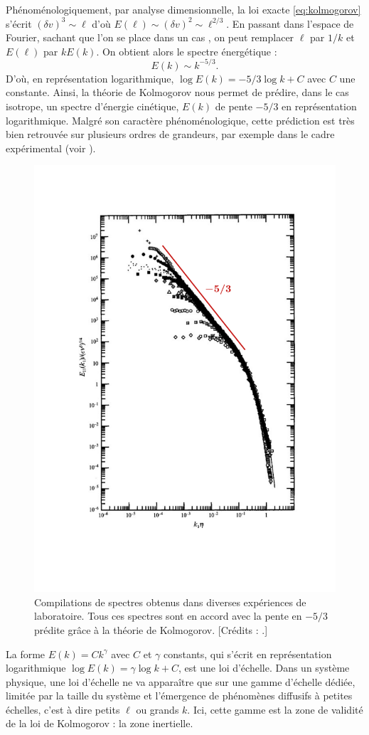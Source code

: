  Phénoménologiquement, par analyse dimensionnelle, la loi exacte \eqref{eq:kolmogorov} s'écrit $(\delta v)^3 \sim \ell$ d'où $E(\ell) \sim (\delta v)^2 \sim \ell^{2/3}$. En passant dans l'espace de Fourier, sachant que l'on se place dans un cas , on peut remplacer $\ell$ par $1/k$ et $E(\ell)$ par $k E(k)$. On obtient alors le spectre énergétique :
 \begin{equation}
     E(k) \sim k^{-5/3}.
 \end{equation} 
 D'où, en représentation logarithmique, $\log E(k) = -5/3 \log k + C $ avec $C$ une constante. Ainsi, la théorie de Kolmogorov nous permet de prédire, dans le cas isotrope, un spectre d'énergie cinétique, $E(k)$ de pente $-5/3$ en représentation logarithmique. Malgré son caractère phénoménologique, cette prédiction est très bien retrouvée sur plusieurs ordres de grandeurs, par exemple dans le cadre expérimental (voir  ). 
 \begin{figure}[]
  \centering
 \includegraphics[width=0.8\linewidth,trim=1cm 4cm 1cm 3cm, clip=true]{./Mainmatter/Part_0/images/spectre_kolmogorov}
 \caption{Compilations de spectres obtenus dans diverses expériences de laboratoire. Tous ces spectres sont en accord avec la pente en $-5/3$ prédite grâce à la théorie de Kolmogorov. [Crédits : \cite{saddoughi_local_1994}.] }
 \label{fig:spec_kolmo}
 \end{figure}
 La forme $E(k) = C k^{\gamma}$ avec $C$ et $\gamma$ constants, qui s'écrit  en représentation logarithmique $\log E(k) = \gamma \log k + C $, est une loi d'échelle. Dans un système physique, une loi d'échelle ne va apparaître que sur une gamme d'échelle dédiée, limitée par la taille du système et l'émergence de phénomènes diffusifs à petites échelles, c'est à dire petits $\ell$ ou grands $k$. Ici, cette gamme est la zone de validité de la loi de Kolmogorov : la zone inertielle. 
 

